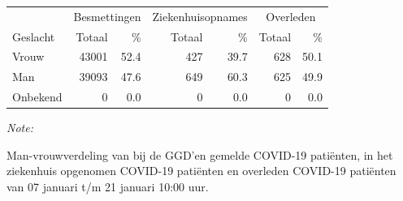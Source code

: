 \documentclass[
  english,
  man,floatsintext]{apa6}
\begin{document}
\begin{table}[H]
\centering\begingroup\fontsize{11}{13}\selectfont

\begin{threeparttable}
\begin{tabular}{lrrrrrr}
\toprule
\multicolumn{1}{c}{ } & \multicolumn{2}{c}{Besmettingen} & \multicolumn{2}{c}{Ziekenhuisopnames} & \multicolumn{2}{c}{Overleden} \\
\cmidrule(l{3pt}r{3pt}){2-3} \cmidrule(l{3pt}r{3pt}){4-5} \cmidrule(l{3pt}r{3pt}){6-7}
Geslacht & Totaal & \% & Totaal & \% & Totaal & \%\\
\midrule
Vrouw & 43001 & 52.4 & 427 & 39.7 & 628 & 50.1\\
Man & 39093 & 47.6 & 649 & 60.3 & 625 & 49.9\\
Onbekend & 0 & 0.0 & 0 & 0.0 & 0 & 0.0\\
\bottomrule
\end{tabular}
\begin{tablenotes}
\item \textit{Note: } 
\item Man-vrouwverdeling van bij de GGD’en gemelde COVID-19 patiënten, in het ziekenhuis opgenomen COVID-19 patiënten en overleden COVID-19 patiënten van 07 januari t/m 21 januari 10:00 uur.
\end{tablenotes}
\end{threeparttable}
\endgroup{}
\end{table}
\newpage
\end{document}
